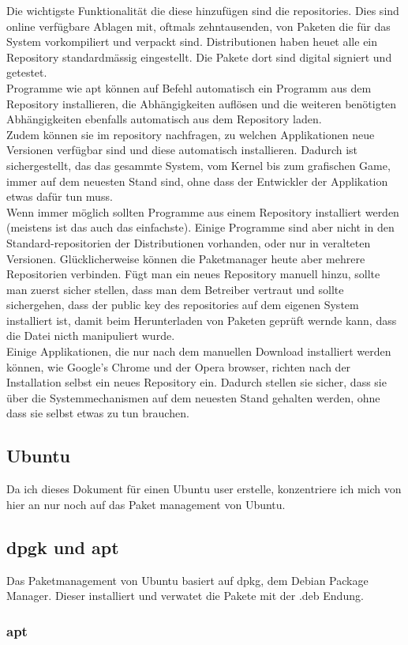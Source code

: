 Die wichtigste Funktionalit\"at die diese hinzuf\"ugen sind die repositories. Dies sind online verf\"ugbare Ablagen mit, oftmals zehntausenden, von Paketen die f\"ur das System vorkompiliert und verpackt sind. Distributionen haben heuet alle ein Repository standardm\"assig eingestellt. Die Pakete dort sind digital signiert und getestet.\\
Programme wie apt k\"onnen auf Befehl automatisch ein Programm aus dem Repository installieren, die Abh\"angigkeiten aufl\"osen und die weiteren ben\"otigten Abh\"angigkeiten ebenfalls automatisch aus dem Repository laden.\\
Zudem k\"onnen sie im repository nachfragen, zu welchen Applikationen neue Versionen verf\"ugbar sind und diese automatisch installieren. Dadurch ist sichergestellt, das das gesammte System, vom Kernel bis zum grafischen Game, immer auf dem neuesten Stand sind, ohne dass der Entwickler der Applikation etwas daf\"ur tun muss.\\
Wenn immer m\"oglich sollten Programme aus einem Repository installiert werden (meistens ist das auch das einfachste). Einige Programme sind aber nicht in den Standard-repositorien der Distributionen vorhanden, oder nur in veralteten Versionen. Gl\"ucklicherweise k\"onnen die Paketmanager heute aber mehrere Repositorien verbinden. F\"ugt man ein neues Repository manuell hinzu, sollte man zuerst sicher stellen, dass man dem Betreiber vertraut und sollte sichergehen, dass der public key des repositories auf dem eigenen System installiert ist, damit beim Herunterladen von Paketen gepr\"uft wernde kann, dass die Datei nicth manipuliert wurde.\\
Einige Applikationen, die nur nach dem manuellen Download installiert werden k\"onnen, wie Google's Chrome und der Opera browser, richten nach der Installation selbst ein neues Repository ein. Dadurch stellen sie sicher, dass sie \"uber die Systemmechanismen auf dem neuesten Stand gehalten werden, ohne dass sie selbst etwas zu tun brauchen.
\subsection{Ubuntu}
Da ich dieses Dokument f\"ur einen Ubuntu user erstelle, konzentriere ich mich von hier an nur noch auf das Paket management von Ubuntu.
\subsection{dpgk und apt}
Das Paketmanagement von Ubuntu basiert auf dpkg, dem Debian Package Manager. Dieser installiert und verwatet die Pakete mit der .deb Endung.

\subsubsection{apt}
